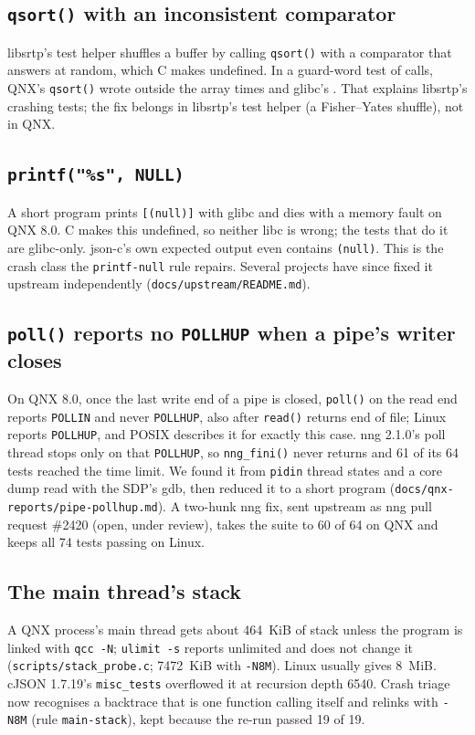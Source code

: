 \documentclass[conference]{IEEEtran}
\begin{document}
\subsection{\texttt{qsort()} with an inconsistent comparator}\label{sec:findings-qsort}
libsrtp's test helper shuffles a buffer by calling \texttt{qsort()} with a comparator that answers at random,
which C makes undefined. In a guard-word test of  calls, QNX's \texttt{qsort()} wrote outside the
array  times and glibc's . That explains libsrtp's crashing tests; the fix belongs in
libsrtp's test helper (a Fisher--Yates shuffle), not in QNX.

\subsection{\texttt{printf("\%s", NULL)}}\label{sec:findings-printf}
A short program prints \texttt{[(null)]} with glibc and dies with a memory fault on QNX 8.0. C makes this
undefined, so neither libc is wrong; the tests that do it are glibc-only. json-c's own expected output even
contains \texttt{(null)}. This is the crash class the \texttt{printf-null} rule repairs. Several projects have
since fixed it upstream independently (\texttt{docs/upstream/README.md}).

\subsection{\texttt{poll()} reports no \texttt{POLLHUP} when a pipe's writer closes}\label{sec:findings-pollhup}
On QNX 8.0, once the last write end of a pipe is closed, \texttt{poll()} on the read end reports \texttt{POLLIN}
and never \texttt{POLLHUP}, also after \texttt{read()} returns end of file; Linux reports \texttt{POLLHUP}, and
POSIX describes it for exactly this case. nng 2.1.0's poll thread stops only on that \texttt{POLLHUP}, so
\texttt{nng\_fini()} never returns and 61 of its 64 tests reached the time limit. We found it from
\texttt{pidin} thread states and a core dump read with the SDP's gdb, then reduced it to a short program
(\texttt{docs/qnx-reports/pipe-pollhup.md}). A two-hunk nng fix, sent upstream as nng pull request \#2420 (open, under review), takes the suite to 60 of 64
on QNX and keeps all 74 tests passing on Linux.

\subsection{The main thread's stack}\label{sec:findings-stack}
A QNX process's main thread gets about 464~KiB of stack unless the program is linked with \texttt{qcc -N};
\texttt{ulimit -s} reports unlimited and does not change it (\texttt{scripts/stack\_probe.c}; 7472~KiB with
\texttt{-N8M}). Linux usually gives 8~MiB. cJSON 1.7.19's \texttt{misc\_tests} overflowed it at recursion depth
6540. Crash triage now recognises a backtrace that is one function calling itself and relinks with
\texttt{-N8M} (rule \texttt{main-stack}), kept because the re-run passed 19 of 19.
\end{document}
